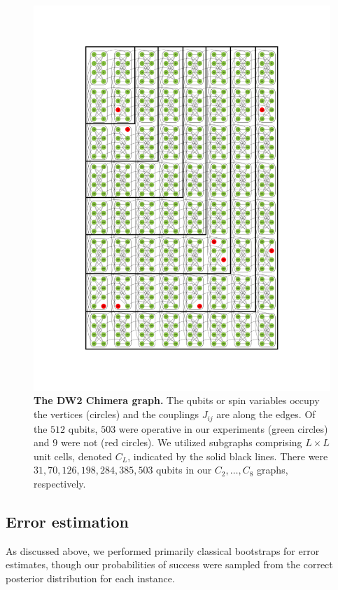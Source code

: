 \begin{figure}[t]
\begin{center}
\includegraphics[width=\columnwidth]{chapters/Planted/C_N_chimeragraph}
\vspace{-1.2cm}
\caption{\textbf{The DW2 Chimera graph.} The qubits or spin variables occupy the vertices (circles) and the couplings $J_{ij}$ are along the edges.
Of the $512$ qubits, $503$ were operative in our experiments (green circles) and $9$ were not (red circles).
We utilized subgraphs comprising $L\times L$ unit cells, denoted $C_L$, indicated by the solid black lines. There were $31, 70, 126, 198,284, 385, 503$ qubits in our $C_2,\dots,C_8$ graphs, respectively.}
\label{fig:chimera}
\end{center}
\end{figure}

\subsection{Error estimation}
\label{app:error-estimation}
As discussed above, we performed primarily classical bootstraps for error estimates, though our probabilities of success were sampled from the correct posterior distribution for each instance.

